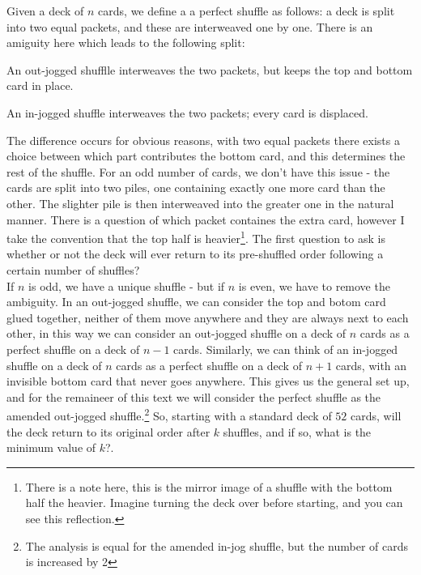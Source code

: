 \documentclass[../../Axiomathic.tex]{subfiles}
\begin{document}
Given a deck of $n$ cards, we define a a perfect shuffle as follows: a deck is split into two equal packets, and these are interweaved one by one. There is an amiguity here which leads to the following split: \\
\begin{defn} An out-jogged shufflle interweaves the two packets, but keeps the top and bottom card in place. \end{defn}
\begin{defn}  An in-jogged shuffle interweaves the two packets; every card is displaced. \end{defn}
The difference occurs for obvious reasons, with two equal packets there exists a choice between which part contributes the bottom card, and this determines the rest of the shuffle. For an odd number of cards, we don't have this issue - the cards are split into two piles, one containing exactly one more card than the other. The slighter pile is then interweaved into the greater one in the natural manner. There is a question of which packet containes the extra card, however I take the convention that the top half is heavier\footnote{There is a note here, this is the mirror image of a shuffle with the bottom half the heavier. Imagine turning the deck over before starting, and you can see this  reflection.}. The first question to ask is whether or not the deck will ever return to its pre-shuffled order following a certain number of shuffles? \\
If $n$ is odd, we have a unique shuffle - but if $n$ is even, we have to remove the ambiguity. In an out-jogged shuffle, we can consider the top and botom card glued together, neither of them move anywhere and they are always next to each other, in this way we can consider an out-jogged shuffle on a deck of $n$ cards as a perfect shuffle on a deck of $n-1$ cards. Similarly, we can think of an in-jogged shuffle on a deck of $n$ cards as a perfect shuffle on a deck of $n+1$ cards, with an invisible bottom card that never goes anywhere. This gives us the general set up, and for the remaineer of this text we will consider the perfect shuffle as the amended out-jogged shuffle.\footnote{The analysis is equal for the amended in-jog shuffle, but the number of cards is increased by 2} So, starting with a standard deck of $52$ cards, will the deck return to its original order after $k$ shuffles, and if so, what is the minimum value of $k$?.
\end{document}
